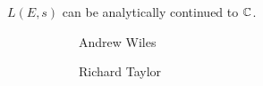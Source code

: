 \begin{frame}[plain]
\begin{thm}
$L(E,s)$ can be analytically continued to $\mathbb{C}$.
\end{thm}
	\begin{figure}[h]
	\centering
	\begin{subfigure}{0.3\textwidth}
	\captionsetup{labelformat=empty}
	\centering
	\caption{\scriptsize Andrew Wiles}
	\end{subfigure}
	\begin{subfigure}{0.3\textwidth}
	\captionsetup{labelformat=empty}
	\centering
	\caption{\scriptsize Richard Taylor}
	\end{subfigure}
	\begin{subfigure}{0.3\textwidth}
	\captionsetup{labelformat=empty}
	\centering

\end{subfigure}
\end{figure}
\end{frame}

